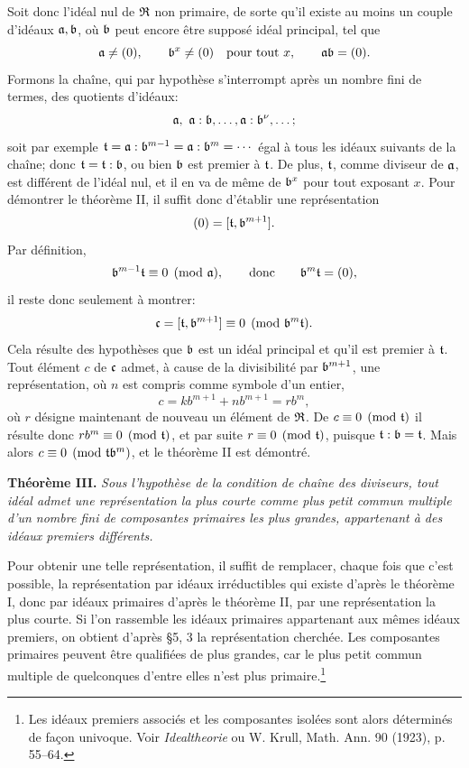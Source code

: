 Soit donc l'idéal nul de $\mathfrak{R}$ non primaire, de sorte qu'il existe au moins un couple d'idéaux $\mathfrak{a},\mathfrak{b}$, où $\mathfrak{b}$ peut encore être supposé idéal principal, tel que
\[
\mathfrak{a}\ne(0),\qquad \mathfrak{b}^x\ne(0)\quad\text{pour tout }x,
\qquad \mathfrak{a}\mathfrak{b}=(0).
\]
Formons la chaîne, qui par hypothèse s'interrompt après un nombre fini de termes, des quotients d'idéaux:
\[
\ma,\ \ma:\mb,\ldots,\ma:\mb^\nu,\ldots;
\]
soit par exemple $\mathfrak{t}=\mathfrak{a}:\mathfrak{b}^{m-1}=\mathfrak{a}:\mathfrak{b}^m=\cdots$ égal à tous les idéaux suivants de la chaîne; donc $\mathfrak{t}=\mathfrak{t}:\mathfrak{b}$, ou bien $\mathfrak{b}$ est premier à $\mathfrak{t}$. De plus, $\mathfrak{t}$, comme diviseur de $\mathfrak{a}$, est différent de l'idéal nul, et il en va de même de $\mathfrak{b}^x$ pour tout exposant $x$. Pour démontrer le théorème II, il suffit donc d'établir une représentation
\[
(0)=[\mathfrak{t},\mathfrak{b}^{m+1}].
\]
Par définition,
\[
\mathfrak{b}^{m-1}\mathfrak{t}\equiv0\pmod{\mathfrak{a}},\qquad\text{donc}\qquad \mathfrak{b}^m\mathfrak{t}=(0),
\]
il reste donc seulement à montrer:
\[
\mathfrak{c}=[\mathfrak{t},\mathfrak{b}^{m+1}]\equiv0\pmod{\mathfrak{b}^m\mathfrak{t}}.
\]
Cela résulte des hypothèses que $\mathfrak{b}$ est un idéal principal et qu'il est premier à $\mathfrak{t}$. Tout élément $c$ de $\mathfrak{c}$ admet, à cause de la divisibilité par $\mathfrak{b}^{m+1}$, une représentation, où $n$ est compris comme symbole d'un entier,
\[
 c=k b^{m+1}+n b^{m+1}=r b^m,
\]
où $r$ désigne maintenant de nouveau un élément de $\mathfrak{R}$. De $c\equiv0\pmod{\mathfrak{t}}$ il résulte donc $r b^m\equiv0\pmod{\mathfrak{t}}$, et par suite $r\equiv0\pmod{\mathfrak{t}}$, puisque $\mathfrak{t}:\mathfrak{b}=\mathfrak{t}$. Mais alors $c\equiv0\pmod{\mathfrak{t}\mathfrak{b}^m}$, et le théorème II est démontré.

\textbf{Théorème III.} \emph{Sous l'hypothèse de la condition de chaîne des diviseurs, tout idéal admet une représentation la plus courte comme plus petit commun multiple d'un nombre fini de composantes primaires les plus grandes, appartenant à des idéaux premiers différents.}

Pour obtenir une telle représentation, il suffit de remplacer, chaque fois que c'est possible, la représentation par idéaux irréductibles qui existe d'après le théorème I, donc par idéaux primaires d'après le théorème II, par une représentation la plus courte. Si l'on rassemble les idéaux primaires appartenant aux mêmes idéaux premiers, on obtient d'après \S{}5, 3 la représentation cherchée. Les composantes primaires peuvent être qualifiées de plus grandes, car le plus petit commun multiple de quelconques d'entre elles n'est plus primaire.\footnote{Les idéaux premiers associés et les composantes isolées sont alors déterminés de façon univoque. Voir \emph{Idealtheorie} ou W. Krull, Math. Ann. 90 (1923), p. 55--64.}
